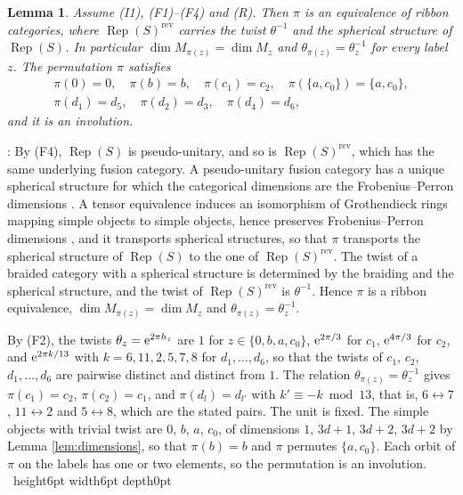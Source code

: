 \documentclass[leqno]{article}
\newcommand{\qed}{\hfill \vrule height6pt  width6pt depth0pt}
\let\i\relax
\newcommand{\i}{\mathrm{i}}
\newcommand{\e}{\mathrm{e}}
\DeclareMathOperator{\Rep}{Rep}
\newtheorem{lemma}[thm]{Lemma}
\newenvironment{proof}[1][]{\noindent {\it Proof #1} : }{\hbox{~}\qed
\smallskip
}
\numberwithin{equation}{section}
\begin{document}
\begin{lemma}
\label{lem:pi-labels}
Assume \textup{(I1)}, \textup{(F1)}--\textup{(F4)} and \textup{(R)}. Then $\pi$ is an equivalence of ribbon categories, where $\Rep(S)^{\mathrm{rev}}$ carries the twist $\theta^{-1}$ and the spherical structure of $\Rep(S)$. In particular $\dim M_{\pi(z)} = \dim M_z$ and $\theta_{\pi(z)} = \theta_z^{-1}$ for every label $z$. The permutation $\pi$ satisfies
\[
\begin{gathered}
\pi(0) = 0,\quad \pi(b) = b,\quad \pi(c_1) = c_2,\quad \pi(\{a,c_0\}) = \{a,c_0\},\\
\pi(d_1) = d_5,\quad \pi(d_2) = d_3,\quad \pi(d_4) = d_6,
\end{gathered}
\]
and it is an involution.
\end{lemma}

\begin{proof}
By (F4), $\Rep(S)$ is pseudo-unitary, and so is $\Rep(S)^{\mathrm{rev}}$, which has the same underlying fusion category. A pseudo-unitary fusion category has a unique spherical structure for which the categorical dimensions are the Frobenius--Perron dimensions \cite[Proposition 8.23 p.~34]{ENO05}. A tensor equivalence induces an isomorphism of Grothendieck rings mapping simple objects to simple objects, hence preserves Frobenius--Perron dimensions \cite[Section 3.3]{EGNO15}, and it transports spherical structures, so that $\pi$ transports the spherical structure of $\Rep(S)$ to the one of $\Rep(S)^{\mathrm{rev}}$. The twist of a braided category with a spherical structure is determined by the braiding and the spherical structure, and the twist of $\Rep(S)^{\mathrm{rev}}$ is $\theta^{-1}$. Hence $\pi$ is a ribbon equivalence, $\dim M_{\pi(z)} = \dim M_z$ and $\theta_{\pi(z)} = \theta_z^{-1}$.

By (F2), the twists $\theta_z = \e^{2\pi\i h_z}$ are $1$ for $z \in \{0,b,a,c_0\}$, $\e^{2\pi\i/3}$ for $c_1$, $\e^{4\pi\i/3}$ for $c_2$, and $\e^{2\pi\i k/13}$ with $k = 6, 11, 2, 5, 7, 8$ for $d_1, \ldots, d_6$, so that the twists of $c_1$, $c_2$, $d_1, \ldots, d_6$ are pairwise distinct and distinct from $1$. The relation $\theta_{\pi(z)} = \theta_z^{-1}$ gives $\pi(c_1) = c_2$, $\pi(c_2) = c_1$, and $\pi(d_l) = d_{l'}$ with $k' \equiv -k \bmod 13$, that is, $6 \leftrightarrow 7$, $11 \leftrightarrow 2$ and $5 \leftrightarrow 8$, which are the stated pairs. The unit is fixed. The simple objects with trivial twist are $0$, $b$, $a$, $c_0$, of dimensions $1$, $3d+1$, $3d+2$, $3d+2$ by Lemma \ref{lem:dimensions}, so that $\pi(b) = b$ and $\pi$ permutes $\{a,c_0\}$. Each orbit of $\pi$ on the labels has one or two elements, so the permutation is an involution.
\end{proof}
\end{document}
